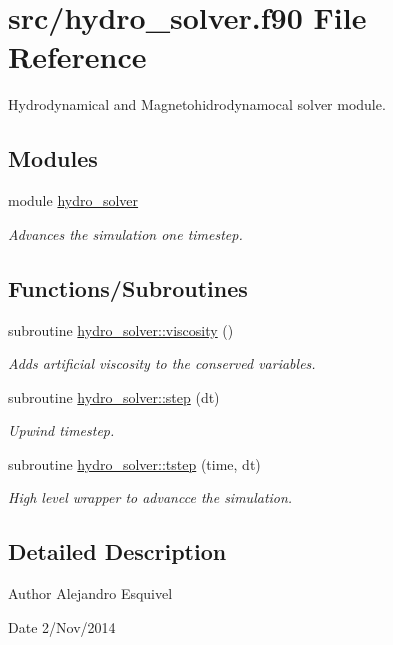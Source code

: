 \hypertarget{hydro__solver_8f90}{}\section{src/hydro\+\_\+solver.f90 File Reference}
\label{hydro__solver_8f90}


Hydrodynamical and Magnetohidrodynamocal solver module.  


\subsection*{Modules}
\begin{DoxyCompactItemize}
\item 
module \hyperlink{namespacehydro__solver}{hydro\+\_\+solver}
\begin{DoxyCompactList}\small\item\em Advances the simulation one timestep. \end{DoxyCompactList}\end{DoxyCompactItemize}
\subsection*{Functions/\+Subroutines}
\begin{DoxyCompactItemize}
\item 
subroutine \hyperlink{namespacehydro__solver_a88127baf969063d6d9a31845fa7c1835}{hydro\+\_\+solver\+::viscosity} ()
\begin{DoxyCompactList}\small\item\em Adds artificial viscosity to the conserved variables. \end{DoxyCompactList}\item 
subroutine \hyperlink{namespacehydro__solver_ac34a166e9ddd81f20f2b271138458a1a}{hydro\+\_\+solver\+::step} (dt)
\begin{DoxyCompactList}\small\item\em Upwind timestep. \end{DoxyCompactList}\item 
subroutine \hyperlink{namespacehydro__solver_aca1a384e66d388e79ca981c0c84680a0}{hydro\+\_\+solver\+::tstep} (time, dt)
\begin{DoxyCompactList}\small\item\em High level wrapper to advancce the simulation. \end{DoxyCompactList}\end{DoxyCompactItemize}


\subsection{Detailed Description}
\begin{DoxyAuthor}{Author}
Alejandro Esquivel 
\end{DoxyAuthor}
\begin{DoxyDate}{Date}
2/\+Nov/2014 
\end{DoxyDate}
